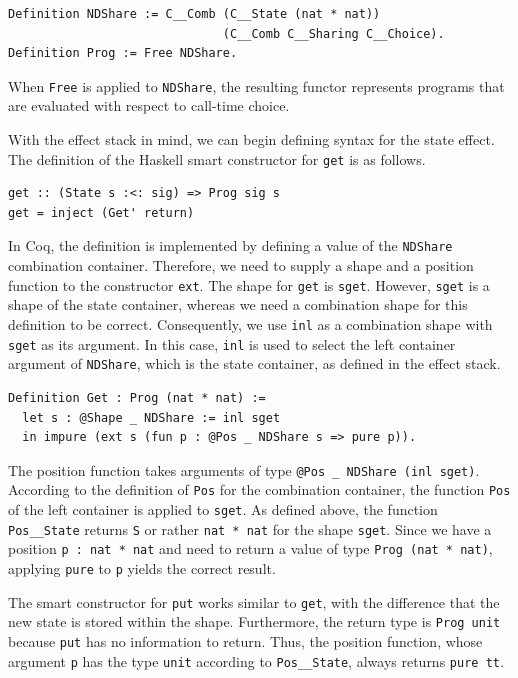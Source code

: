 \documentclass[a4paper, 11pt, fleqn, twoside, abstract=on]{scrreprt}
\newcommand{\hinl}[1]{\texttt{#1}}
\newcommand{\cinl}[1]{\texttt{#1}}
\begin{document}
\begin{verbatim}
Definition NDShare := C__Comb (C__State (nat * nat)) 
                              (C__Comb C__Sharing C__Choice).
Definition Prog := Free NDShare.
\end{verbatim}

When \cinl{Free} is applied to \cinl{NDShare}, the resulting functor represents programs that are evaluated with respect to call-time choice.

With the effect stack in mind, we can begin defining syntax for the state effect.
The definition of the Haskell smart constructor for \hinl{get} is as follows.

\begin{verbatim}
get :: (State s :<: sig) => Prog sig s
get = inject (Get' return)
\end{verbatim}

In Coq, the definition is implemented by defining a value of the \cinl{NDShare} combination container.
Therefore, we need to supply a shape and a position function to the constructor \cinl{ext}.
The shape for \hinl{get} is \cinl{sget}.
However, \cinl{sget} is a shape of the state container, whereas we need a combination shape for this definition to be correct.
Consequently, we use \cinl{inl} as a combination shape with \cinl{sget} as its argument.
In this case, \cinl{inl} is used to select the left container argument of \cinl{NDShare}, which is the state container, as defined in the effect stack.

\begin{verbatim}
Definition Get : Prog (nat * nat) :=
  let s : @Shape _ NDShare := inl sget
  in impure (ext s (fun p : @Pos _ NDShare s => pure p)).
\end{verbatim}

The position function takes arguments of type \cinl{@Pos _ NDShare (inl sget)}.
According to the definition of \cinl{Pos} for the combination container, the function \cinl{Pos} of the left container is applied to \cinl{sget}.
As defined above, the function \cinl{Pos__State} returns \cinl{S} or rather \cinl{nat * nat} for the shape \cinl{sget}.
Since we have a position \cinl{p : nat * nat} and need to return a value of type \cinl{Prog (nat * nat)}, applying \cinl{pure} to \cinl{p} yields the correct result.

The smart constructor for \hinl{put} works similar to \hinl{get}, with the difference that the new state is stored within the shape.
Furthermore, the return type is \cinl{Prog unit} because \hinl{put} has no information to return.
Thus, the position function, whose argument \cinl{p} has the type \cinl{unit} according to \cinl{Pos__State}, always returns \cinl{pure tt}.
\end{document}
